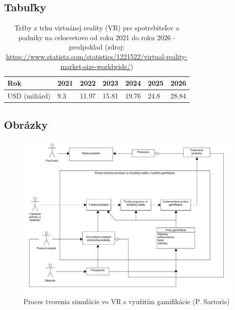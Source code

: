 \documentclass[10pt,slovak,a4paper]{article}
\begin{document}
\subsection*{Tabuľky} \label{Tabulky}
\begin{table}[htb] 
\centering
\begin{adjustbox}{width=1\textwidth}
\begin{tabular}{|l|l|l|l|l|l|l|}
\hline
Rok           & 2021 & 2022  & 2023  & 2024  & 2025 & 2026  \\ \hline
USD (miliárd) & 9.3  & 11.97 & 15.81 & 19.76 & 24.8 & 28.84 \\ \hline
\end{tabular}
\end{adjustbox}
\caption{Tržby z trhu virtuánej reality (VR) pre spotrebiteľov a podniky na celosvetovo od roku 2021 do roku 2026 - predpoklad (zdroj: \url{https://www.statista.com/statistics/1221522/virtual-reality-market-size-worldwide/})}
\end{table}

\subsection*{Obrázky} \label{Obrazky}

\begin{figure}[tbhp]
    \centering
    \label{Diagram}
    \includegraphics[scale=0.35]{images_article/umlet mip.pdf}
    \caption{Proces tvorenia simulácie vo VR s využitím gamifikácie (P. Sartoris)}
\end{figure}
\end{document}
